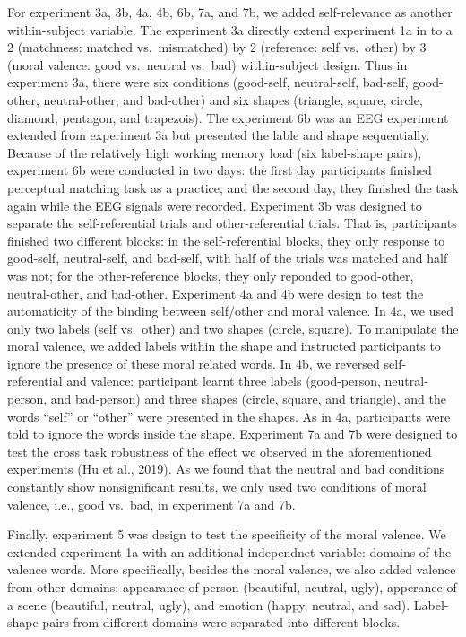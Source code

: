 \documentclass[man]{apa6}
\begin{document}
For experiment 3a, 3b, 4a, 4b, 6b, 7a, and 7b, we added self-relevance as another within-subject variable. The experiment 3a directly extend experiment 1a in to a 2 (matchness: matched vs.~mismatched) by 2 (reference: self vs.~other) by 3 (moral valence: good vs.~neutral vs.~bad) within-subject design. Thus in experiment 3a, there were six conditions (good-self, neutral-self, bad-self, good-other, neutral-other, and bad-other) and six shapes (triangle, square, circle, diamond, pentagon, and trapezois). The experiment 6b was an EEG experiment extended from experiment 3a but presented the lable and shape sequentially. Because of the relatively high working memory load (six label-shape pairs), experiment 6b were conducted in two days: the first day participants finished perceptual matching task as a practice, and the second day, they finished the task again while the EEG signals were recorded. Experiment 3b was designed to separate the self-referential trials and other-referential trials. That is, participants finished two different blocks: in the self-referential blocks, they only response to good-self, neutral-self, and bad-self, with half of the trials was matched and half was not; for the other-reference blocks, they only reponded to good-other, neutral-other, and bad-other. Experiment 4a and 4b were design to test the automaticity of the binding between self/other and moral valence. In 4a, we used only two labels (self vs.~other) and two shapes (circle, square). To manipulate the moral valence, we added labels within the shape and instructed participants to ignore the presence of these moral related words. In 4b, we reversed self-referential and valence: participant learnt three labels (good-person, neutral-person, and bad-person) and three shapes (circle, square, and triangle), and the words \enquote{self} or \enquote{other} were presented in the shapes. As in 4a, participants were told to ignore the words inside the shape. Experiment 7a and 7b were designed to test the cross task robustness of the effect we observed in the aforementioned experiments (Hu et al., 2019). As we found that the neutral and bad conditions constantly show nonsignificant results, we only used two conditions of moral valence, i.e., good vs.~bad, in experiment 7a and 7b.

Finally, experiment 5 was design to test the specificity of the moral valence. We extended experiment 1a with an additional independnet variable: domains of the valence words. More specifically, besides the moral valence, we also added valence from other domains: appearance of person (beautiful, neutral, ugly), apperance of a scene (beautiful, neutral, ugly), and emotion (happy, neutral, and sad). Label-shape pairs from different domains were separated into different blocks.
\end{document}
